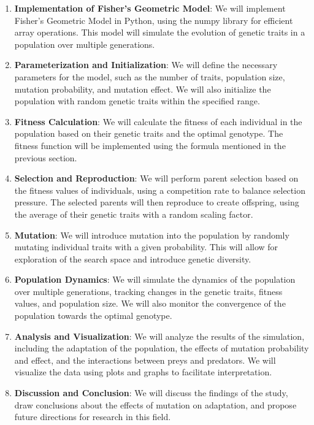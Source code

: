 \documentclass{article}
\begin{document}
\begin{enumerate}
    \item \textbf{Implementation of Fisher's Geometric Model}: We will implement Fisher's Geometric Model in Python, using the numpy library for efficient array operations. This model will simulate the evolution of genetic traits in a population over multiple generations.
    
    \item \textbf{Parameterization and Initialization}: We will define the necessary parameters for the model, such as the number of traits, population size, mutation probability, and mutation effect. We will also initialize the population with random genetic traits within the specified range.
    
    \item \textbf{Fitness Calculation}: We will calculate the fitness of each individual in the population based on their genetic traits and the optimal genotype. The fitness function will be implemented using the formula mentioned in the previous section.
    
    \item \textbf{Selection and Reproduction}: We will perform parent selection based on the fitness values of individuals, using a competition rate to balance selection pressure. The selected parents will then reproduce to create offspring, using the average of their genetic traits with a random scaling factor.
    
    \item \textbf{Mutation}: We will introduce mutation into the population by randomly mutating individual traits with a given probability. This will allow for exploration of the search space and introduce genetic diversity.
    
    \item \textbf{Population Dynamics}: We will simulate the dynamics of the population over multiple generations, tracking changes in the genetic traits, fitness values, and population size. We will also monitor the convergence of the population towards the optimal genotype.
    
    \item \textbf{Analysis and Visualization}: We will analyze the results of the simulation, including the adaptation of the population, the effects of mutation probability and effect, and the interactions between preys and predators. We will visualize the data using plots and graphs to facilitate interpretation.
    
    \item \textbf{Discussion and Conclusion}: We will discuss the findings of the study, draw conclusions about the effects of mutation on adaptation, and propose future directions for research in this field.
\end{enumerate}
\end{document}
